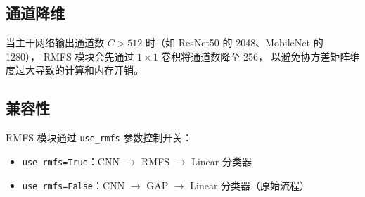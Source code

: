 \documentclass[12pt,a4paper]{article}
\begin{document}
\subsection{通道降维}

当主干网络输出通道数 $C > 512$ 时（如 ResNet50 的 2048、MobileNet 的 1280），
RMFS 模块会先通过 $1 \times 1$ 卷积将通道数降至 256，
以避免协方差矩阵维度过大导致的计算和内存开销。

\subsection{兼容性}

RMFS 模块通过 \texttt{use\_rmfs} 参数控制开关：
\begin{itemize}
    \item \texttt{use\_rmfs=True}：CNN $\rightarrow$ RMFS $\rightarrow$ Linear 分类器
    \item \texttt{use\_rmfs=False}：CNN $\rightarrow$ GAP $\rightarrow$ Linear 分类器（原始流程）
\end{itemize}
\end{document}
